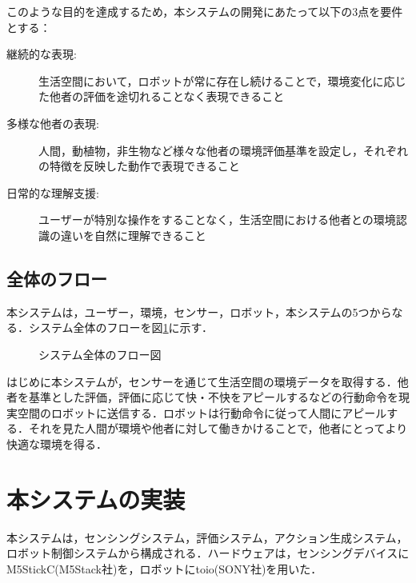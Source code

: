 \documentclass[paper=a4paper,jafontsize=9pt,head_space=15mm,gutter=20mm,
twocolumn,number_of_lines=49, line_length=26zw]{myuarticle}
\begin{document}
このような目的を達成するため，本システムの開発にあたって以下の3点を要件とする：

\begin{description}
  \item[継続的な表現:] 生活空間において，ロボットが常に存在し続けることで，環境変化に応じた他者の評価を途切れることなく表現できること
  \item[多様な他者の表現:] 人間，動植物，非生物など様々な他者の環境評価基準を設定し，それぞれの特徴を反映した動作で表現できること
  \item[日常的な理解支援:] ユーザーが特別な操作をすることなく，生活空間における他者との環境認識の違いを自然に理解できること
\end{description}

\subsection{全体のフロー}
本システムは，ユーザー，環境，センサー，ロボット，本システムの5つからなる．システム全体のフローを図\ref{fig:system-flow}に示す．

\fboxsep=0pt            %
\fboxrule=1pt            %
\begin{figure}[h]
  \centering
  \caption{システム全体のフロー図}
  \label{fig:system-flow}
\end{figure}

はじめに本システムが，センサーを通じて生活空間の環境データを取得する．他者を基準とした評価，評価に応じて快・不快をアピールするなどの行動命令を現実空間のロボットに送信する．ロボットは行動命令に従って人間にアピールする．それを見た人間が環境や他者に対して働きかけることで，他者にとってより快適な環境を得る．

\section{本システムの実装}
本システムは，センシングシステム，評価システム，アクション生成システム，ロボット制御システムから構成される．ハードウェアは，センシングデバイスにM5StickC(M5Stack社)を，ロボットにtoio(SONY社)を用いた．
\end{document}
